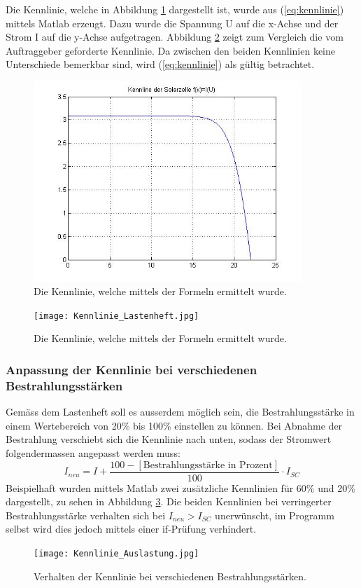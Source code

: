 Die Kennlinie, welche in Abbildung \ref{fig:Kennlinie} dargestellt ist, wurde aus (\ref{eq:kennlinie}) mittels Matlab erzeugt. Dazu wurde die Spannung U auf die x-Achse und der Strom I auf die y-Achse aufgetragen. Abbildung \ref{fig:Kennlinie_Lastenheft} zeigt zum Vergleich die vom Auftraggeber geforderte Kennlinie. Da zwischen den beiden Kennlinien keine Unterschiede bemerkbar sind, wird (\ref{eq:kennlinie}) als gültig betrachtet.
\begin{figure}
	\centering
		\includegraphics[width=0.9\textwidth]{Kennlinie.jpg}
	\caption{Die Kennlinie, welche mittels der Formeln ermittelt wurde.}
	\label{fig:Kennlinie}
\end{figure}
\begin{figure}
	\centering
		\texttt{[image: Kennlinie\_Lastenheft.jpg]}
	\caption{Die Kennlinie, welche mittels der Formeln ermittelt wurde.}
	\label{fig:Kennlinie_Lastenheft}
\end{figure}

\subsubsection{Anpassung der Kennlinie bei verschiedenen Bestrahlungsstärken}
Gemäss dem Lastenheft soll es ausserdem möglich sein, die Bestrahlungsstärke in einem Wertebereich von 20\% bis 100\% einstellen zu können. Bei Abnahme der Bestrahlung verschiebt sich die Kennlinie nach unten, sodass der Stromwert folgendermassen angepasst werden muss:
\begin{equation}
	I_{neu}=I+\frac{100-\left[\text{Bestrahlungsstärke in Prozent}\right]}{100}\cdot I_{SC}
\label{eq:kennlinie_prozent}
\end{equation}
Beispielhaft wurden mittels Matlab zwei zusätzliche Kennlinien für 60\% und 20\% dargestellt, zu sehen in Abbildung \ref{fig:Kennlinie_Auslastung}. Die beiden Kennlinien bei verringerter Bestrahlungsstärke verhalten sich bei $I_{neu}>I_{SC}$ unerwünscht, im Programm selbst wird dies jedoch mittels einer if-Prüfung verhindert.
\begin{figure}
	\centering
		\texttt{[image: Kennlinie\_Auslastung.jpg]}
	\caption{Verhalten der Kennlinie bei verschiedenen Bestrahlungsstärken.}
	\label{fig:Kennlinie_Auslastung}
\end{figure}
